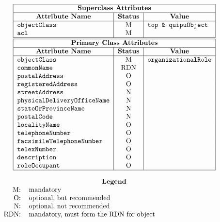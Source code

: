 
\smaller

\[\begin{tabular}{|l|c|l|}
\hline
\multicolumn{3}{|c|}{\bf Superclass Attributes}\\
\hline
\multicolumn{1}{|c|}{\bf Attribute Name}&
			\multicolumn{1}{c|}{\bf Status}&
				\multicolumn{1}{c|}{\bf Value}\\
\hline
\verb"objectClass"&	M&	\verb"top & quipuObject"\\
\verb"acl"&		M&	\\
\hline
\hline
\multicolumn{3}{|c|}{\bf Primary Class Attributes}\\
\hline
\multicolumn{1}{|c|}{\bf Attribute Name}&
			\multicolumn{1}{c|}{\bf Status}&
				\multicolumn{1}{c|}{\bf Value}\\
\hline
\verb"objectClass"&	M&	\verb"organizationalRole"\\
\verb"commonName"&	RDN&	\\
\verb"postalAddress"&	O&	\\
\verb"registeredAddress"&
			O&	\\
\verb"streetAddress"&	N&	\\
\verb"physicalDeliveryOfficeName"&
			N&	\\
\verb"stateOrProvinceName"&
			N&	\\
\verb"postalCode"&	N&	\\
\verb"localityName"&	O&	\\
\verb"telephoneNumber"&	O&	\\
\verb"facsimileTelephoneNumber"&
			O&	\\
\verb"telexNumber"&	O&	\\
\verb"description"&	O&	\\
\verb"roleOccupant"&	O&	\\
\hline
\end{tabular}\]

\[\begin{tabular}{rp{4in}}
\multicolumn{2}{c}{\bf Legend}\\
M:&	mandatory\\
O:&	optional, but recommended\\
N:&	optional, not recommended\\
RDN:&	mandatory, must form the RDN for object
\end{tabular}\]

